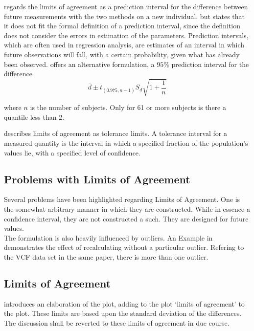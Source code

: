 \documentclass[Main.tex]{subfiles}
\begin{document}
	\citet{BXC2008} regards the limits of agreement as a prediction
	interval for the difference between future measurements with the
	two methods on a new individual, but states that it does not fit
	the formal definition of a prediction interval, since the
	definition does not consider the errors in estimation of the
	parameters. Prediction intervals, which are often used in
	regression analysis, are estimates of an interval in which future
	observations will fall, with a certain probability, given what has
	already been observed. \citet{BXC2008} offers an alternative
	formulation, a $95\%$ prediction interval for the difference
	\begin{equation}
	\bar{d} \pm t_{(0.975, n-1)}S_{d} \sqrt{1+\frac{1}{n}}
	\end{equation}
	
	\noindent where $n$ is the number of subjects. Only for 61 or more
	subjects is there a quantile less than 2.
	
	\citet{luiz} describes limits of agreement as tolerance limits. A
	tolerance interval for a measured quantity is the interval in
	which a specified fraction of the population's values lie, with a
	specified level of confidence.
	
	
	
	
	\subsection{Problems with Limits of Agreement}
	
	Several problems have been highlighted regarding Limits of
	Agreement. One is the somewhat arbitrary manner in which they are
	constructed. While in essence a confidence interval, they are not
	constructed a such. They are designed for future values.
	\\
	The formulation is also heavily influenced by outliers. An Example
	in \citet*{BA83} demonstrates the effect of recalculating without
	a particular outlier. Refering to the VCF data set in the same
	paper, there is more than one outlier.
	
	
	
	\subsection{Limits of Agreement}
	\citet{BA86} introduces an elaboration of the plot, adding to the
	plot `limits of agreement' to the plot. These limits are based
	upon the standard deviation of the differences. The discussion
	shall be reverted to these limits of agreement in due course.
\end{document}
